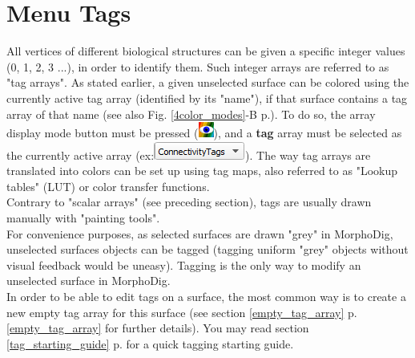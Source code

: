 
\chapter{Menu Tags}\label{tags_chapter}
\minitoc 


All vertices of different biological structures can be given a specific integer values (0, 1, 2, 3 ...), in order to identify them. Such integer arrays are referred to as "tag arrays". 
As stated earlier, a given unselected surface can be colored using the currently active tag array (identified by its "name"), if that surface contains a tag array of that name (see also Fig. \ref{4color_modes}-B p.\pageref{4color_modes}). To do so, the array display mode button must be pressed (\includegraphics[scale=0.7]{images/04/show_color_scale.png}), and a \textbf{tag} array must be selected as the currently active array (ex:\includegraphics[scale=0.5]{images/04/scalarcombo_tag.png}). The way tag arrays are translated into colors can be set up using tag maps, also referred to as "Lookup tables" (LUT) or color transfer functions. \\
Contrary to "scalar arrays" (see preceding section), tags are usually drawn manually with "painting tools". \\
For convenience purposes, as selected surfaces are drawn "grey" in MorphoDig, unselected surfaces objects can be tagged (tagging uniform "grey" objects without visual feedback would be uneasy). Tagging is the only way to modify an unselected surface in MorphoDig. \\
In order to be able to edit tags on a surface, the most common way is to create a new empty tag array for this surface (see section \ref{empty_tag_array} p. \ref{empty_tag_array} for further details). You may read section \ref{tag_starting_guide} p.\pageref{tag_starting_guide} for a quick tagging starting guide. 


